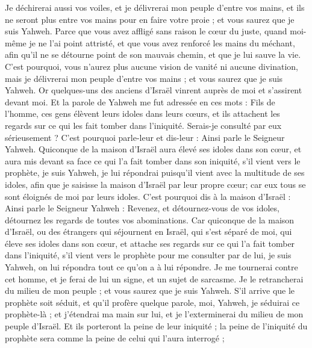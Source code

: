\begin{multicols}{2}
Je déchirerai aussi vos voiles, et je délivrerai mon peuple d'entre vos mains, et ils ne seront plus entre vos mains pour en faire votre proie ; et vous saurez que je suis Yahweh.
Parce que vous avez affligé sans raison le cœur du juste, quand moi-même je ne l'ai point attristé, et que vous avez renforcé les mains du méchant, afin qu'il ne se détourne point de son mauvais chemin, et que je lui sauve la vie.
C'est pourquoi, vous n'aurez plus aucune vision de vanité ni aucune divination, mais je délivrerai mon peuple d'entre vos mains ; et vous saurez que je suis Yahweh.
\VerseOne{}Or quelques-uns des anciens d'Israël vinrent auprès de moi et s'assirent devant moi.
Et la parole de Yahweh me fut adressée en ces mots :
Fils de l'homme, ces gens élèvent leurs idoles dans leurs cœurs, et ils attachent les regards sur ce qui les fait tomber dans l'iniquité. Serais-je consulté par eux sérieusement ?
C'est pourquoi parle-leur et dis-leur : Ainsi parle le Seigneur Yahweh. Quiconque de la maison d'Israël aura élevé ses idoles dans son cœur, et aura mis devant sa face ce qui l'a fait tomber dans son iniquité, s'il vient vers le prophète, je suis Yahweh, je lui répondrai puisqu'il vient avec la multitude de ses idoles,
afin que je saisisse la maison d'Israël par leur propre cœur; car eux tous se sont éloignés de moi par leurs idoles.
C'est pourquoi dis à la maison d'Israël : Ainsi parle le Seigneur Yahweh : Revenez, et détournez-vous de vos idoles, détournez les regards de toutes vos abominations.
Car quiconque de la maison d'Israël, ou des étrangers qui séjournent en Israël, qui s'est séparé de moi, qui éleve ses idoles dans son cœur, et attache ses regards sur ce qui l'a fait tomber dans l'iniquité, s'il vient vers le prophète pour me consulter par de lui, je suis Yahweh, on lui répondra tout ce qu'on a à lui répondre.
Je me tournerai contre cet homme, et je ferai de lui un signe, et un sujet de sarcasme. Je le retrancherai du milieu de mon peuple ; et vous saurez que je suis Yahweh.
S'il arrive que le prophète soit séduit, et qu'il profère quelque parole, moi, Yahweh, je séduirai ce prophète-là ; et j'étendrai ma main sur lui, et je l'exterminerai du milieu de mon peuple d'Israël.
Et ils porteront la peine de leur iniquité ; la peine de l'iniquité du prophète sera comme la peine de celui qui l'aura interrogé ;

\end{multicols}
